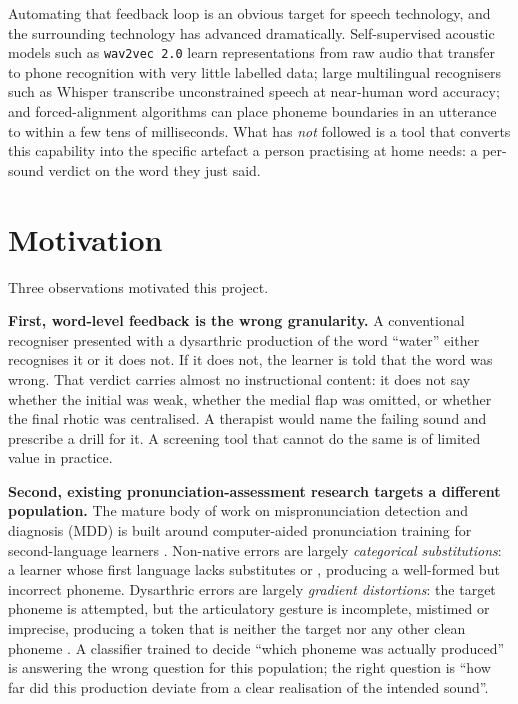 Automating that feedback loop is an obvious target for speech technology, and
the surrounding technology has advanced dramatically. Self-supervised acoustic
models such as \texttt{wav2vec\,2.0} \cite{baevski2020wav2vec} learn
representations from raw audio that transfer to phone recognition with very
little labelled data; large multilingual recognisers such as Whisper
\cite{radford2023robust} transcribe unconstrained speech at near-human word
accuracy; and forced-alignment algorithms can place phoneme boundaries in an
utterance to within a few tens of milliseconds. What has \emph{not} followed is
a tool that converts this capability into the specific artefact a person
practising at home needs: a per-sound verdict on the word they just said.

\section{Motivation}
\label{sec:motivation}

Three observations motivated this project.

\textbf{First, word-level feedback is the wrong granularity.} A conventional
recogniser presented with a dysarthric production of the word ``water'' either
recognises it or it does not. If it does not, the learner is told that the word
was wrong. That verdict carries almost no instructional content: it does not
say whether the initial  was weak, whether the medial flap  was
omitted, or whether the final rhotic  was centralised. A therapist would
name the failing sound and prescribe a drill for it. A screening tool that
cannot do the same is of limited value in practice.

\textbf{Second, existing pronunciation-assessment research targets a different
population.} The mature body of work on mispronunciation detection and
diagnosis (MDD) is built around computer-aided pronunciation training for
second-language learners \cite{witt2000phone,li2016mispronunciation}. Non-native
errors are largely \emph{categorical substitutions}: a learner whose first
language lacks  substitutes  or , producing a well-formed but
incorrect phoneme. Dysarthric errors are largely \emph{gradient distortions}:
the target phoneme is attempted, but the articulatory gesture is incomplete,
mistimed or imprecise, producing a token that is neither the target nor any
other clean phoneme \cite{kim2011vowel}. A classifier trained to decide ``which
phoneme was actually produced'' is answering the wrong question for this
population; the right question is ``how far did this production deviate from a
clear realisation of the intended sound''.

